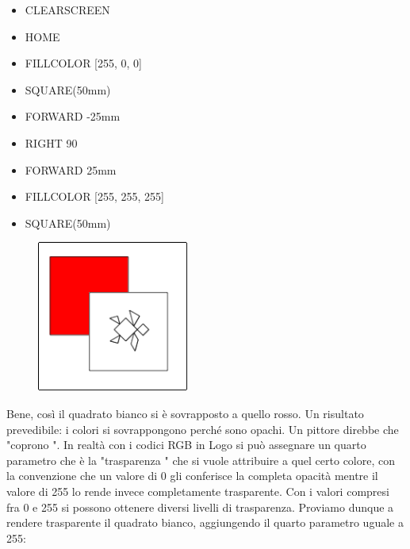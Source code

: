 \vskip 1cm

\begin{scriptsize}
\begin{minipage}{0.40\textwidth}
\begin{itemize}[itemsep=-3pt,parsep=2pt]
\item[] CLEARSCREEN
\item[] HOME
\item[] FILLCOLOR [255, 0, 0]                                
\item[] SQUARE(50mm)
\item[] FORWARD -25mm
\item[] RIGHT 90                                             
\item[] FORWARD 25mm
\item[] FILLCOLOR [255, 255, 255]
\item[] SQUARE(50mm)                                         
\end{itemize}
\end{minipage}
\end{scriptsize}
\begin{minipage}{0.4\textwidth}
\begin{figure}[H]
   \includegraphics[width=5.0cm,trim=4 4 8 4,clip]{./images/disegnare/disegnare-18.png}
   \label{dis-17}
\end{figure}
\end{minipage} \hfill

\vskip 1cm

Bene, così il quadrato bianco si è sovrapposto a quello rosso. Un risultato prevedibile: i colori si sovrappongono perché sono opachi. Un pittore direbbe che  "coprono ". In realtà con i codici RGB in Logo si può assegnare un quarto parametro che è la  "trasparenza " che si vuole attribuire a quel certo colore, con la convenzione che un valore di 0 gli conferisce la completa opacità mentre il valore di 255 lo rende invece completamente trasparente. Con i valori compresi fra 0 e 255 si possono ottenere diversi livelli di trasparenza. Proviamo dunque a rendere trasparente il quadrato bianco, aggiungendo il quarto parametro uguale a 255:

